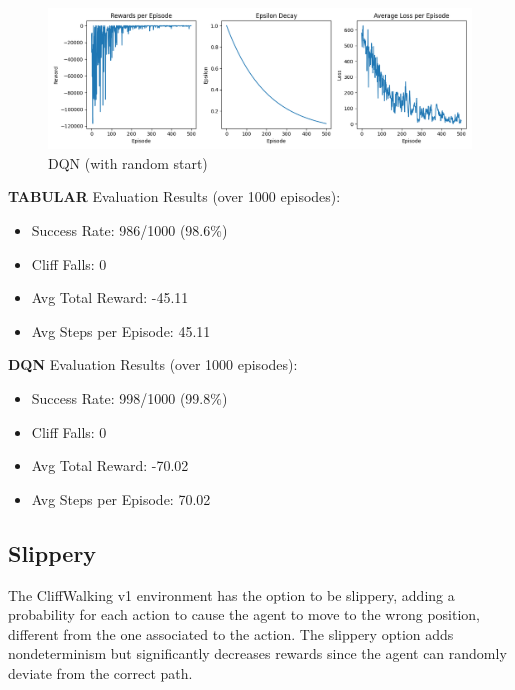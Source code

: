 \documentclass[a4paper,12pt]{article}
\begin{document}
\begin{figure}[H]
    \centering
    \includegraphics[width=\linewidth]{1_32_0995_64_rand_slip_dqn.png}
    \caption{DQN (with random start)}
\end{figure}
\noindent \textbf{TABULAR} Evaluation Results (over 1000 episodes):
\begin{itemize}
    \item Success Rate: 986/1000 (98.6\%)
    \item Cliff Falls: 0
    \item Avg Total Reward: -45.11
    \item Avg Steps per Episode: 45.11
\end{itemize}
\textbf{DQN} Evaluation Results (over 1000 episodes):
\begin{itemize}
    \item Success Rate: 998/1000 (99.8\%)
    \item Cliff Falls: 0
    \item Avg Total Reward: -70.02
    \item Avg Steps per Episode: 70.02
\end{itemize}
\subsection{Slippery}
The CliffWalking v1 environment has the option to be slippery, adding a probability for each action to cause the agent to move to the wrong position, different from the one associated to the action. 
The slippery option adds nondeterminism but significantly decreases rewards since the agent can randomly deviate from the correct path.
\end{document}
